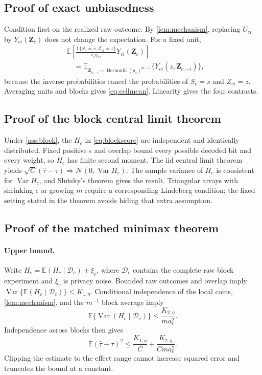 \documentclass[11pt]{article}
\theoremstyle{definition}
\theoremstyle{remark}
\newcommand{\E}{\mathbb{E}}
\newcommand{\Var}{\operatorname{Var}}
\newcommand{\ind}{\mathbf{1}}
\newcommand{\doisig}{a_{\epsilon}}
\DeclareMathOperator{\Bern}{Bernoulli}
\begin{document}
\subsection{Proof of exact unbiasedness}

Condition first on the realized raw outcome. By \cref{lem:mechanism}, replacing $U_{ci}$ by
$Y_{ci}(\mathbf Z_c)$ does not change the expectation. For a fixed unit,
\begin{align*}
&\E\left[
  \frac{\ind\{S_c=s,Z_{ci}=z\}}{r_sq_{sz}}
  Y_{ci}(\mathbf Z_c)
  \right]\\
&\quad=\E_{\mathbf Z_{c,-i}\sim\Bern(p_s)^{m-1}}
  \{Y_{ci}(z,\mathbf Z_{c,-i})\},
\end{align*}
because the inverse probabilities cancel the probabilities of $S_c=s$ and $Z_{ci}=z$.
Averaging units and blocks gives \eqref{eq:cellmean}. Linearity gives the four contrasts.

\subsection{Proof of the block central limit theorem}

Under \cref{ass:block}, the $H_c$ in \eqref{eq:blockscore} are independent and identically
distributed. Fixed positive $\epsilon$ and overlap bound every possible decoded bit and every
weight, so $H_c$ has finite second moment. The iid central limit theorem yields
$\sqrt C(\widehat\tau-\tau)\Rightarrow\mathcal N(0,\Var H_c)$. The sample variance of $H_c$
is consistent for $\Var H_c$, and Slutsky's theorem gives the result. Triangular arrays with
shrinking $\epsilon$ or growing $m$ require a corresponding Lindeberg condition; the fixed
setting stated in the theorem avoids hiding that extra assumption.

\subsection{Proof of the matched minimax theorem}

\paragraph{Upper bound.}
Write $H_c=\E(H_c\mid\mathcal D_c)+\xi_c$, where $\mathcal D_c$ contains the complete raw
block experiment and $\xi_c$ is privacy noise. Bounded raw outcomes and overlap imply
$\Var\{\E(H_c\mid\mathcal D_c)\}\le K_{1,\eta}$. Conditional independence of the local coins,
\cref{lem:mechanism}, and the $m^{-1}$ block average imply
\[
  \E\{\Var(H_c\mid\mathcal D_c)\}
  \le \frac{K_{2,\eta}}{m\doisig^2}.
\]
Independence across blocks then gives
\[
  \E(\widehat\tau-\tau)^2
  \le \frac{K_{1,\eta}}{C}
  +\frac{K_{2,\eta}}{Cm\doisig^2}.
\]
Clipping the estimate to the effect range cannot increase squared error and truncates the bound
at a constant.
\end{document}
